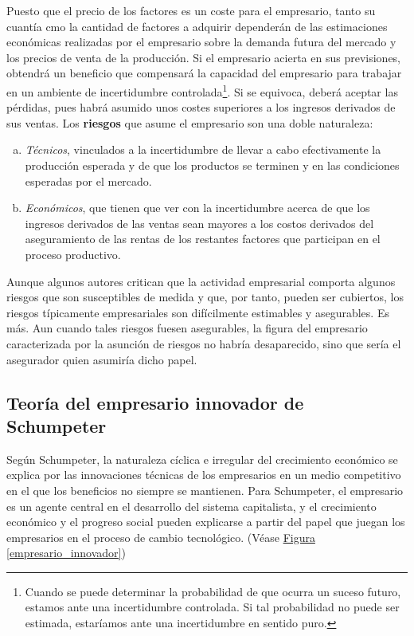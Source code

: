 \documentclass[12pt,a4paper,spanish]{report}
\begin{document}
			 Puesto que el precio de los factores es un coste para el empresario, tanto su cuantía cmo la cantidad de factores a adquirir dependerán de las estimaciones económicas realizadas por el empresario sobre la demanda futura del mercado y los precios de venta de la producción. Si el empresario acierta en sus previsiones, obtendrá un beneficio que compensará la capacidad del empresario para trabajar en un ambiente de incertidumbre controlada\footnote{Cuando se puede determinar la probabilidad de que ocurra un suceso futuro, estamos ante una incertidumbre controlada. Si tal probabilidad no puede ser estimada, estaríamos ante una incertidumbre en sentido puro.}. Si se equivoca, deberá aceptar las pérdidas, pues habrá asumido unos costes superiores a los ingresos derivados de sus ventas.
			 \newpage
			 Los \textbf{riesgos} que asume el empresario son una doble naturaleza:
			 \begin{enumerate}[a)]
			 	\item \textcolor[rgb]{0.9,0.3,0.3}{\emph{Técnicos}}, vinculados a la incertidumbre de llevar a cabo efectivamente la producción esperada y de que los productos se terminen y en las condiciones esperadas por el mercado.
			 	\item \textcolor[rgb]{0.9,0.3,0.3}{\emph{Económicos}}, que tienen que ver con la incertidumbre acerca de que los ingresos derivados de las ventas sean mayores a los costos derivados del aseguramiento de las rentas de los restantes factores que participan en el proceso productivo.
			 \end{enumerate}

			 Aunque algunos autores critican que la actividad empresarial comporta algunos riesgos que son susceptibles de medida y que, por tanto, pueden ser cubiertos, los riesgos típicamente empresariales son difícilmente estimables y asegurables. Es más. Aun cuando tales riesgos fuesen asegurables, la figura del empresario caracterizada por la asunción de riesgos no habría desaparecido, sino que sería el asegurador quien asumiría dicho papel.

		\subsection{\textcolor[rgb]{0.9,0.3,0.3}Teoría del empresario innovador de Schumpeter}
			Según Schumpeter, la naturaleza cíclica e irregular del crecimiento económico se explica por las innovaciones técnicas de los empresarios en un medio competitivo en el que los beneficios no siempre se mantienen. Para Schumpeter, el empresario es un agente central en el desarrollo del sistema capitalista, y el crecimiento económico y el progreso social pueden explicarse a partir del papel que juegan los empresarios en el proceso de cambio tecnológico. (Véase \hyperref[empresario_innovador]{Figura \ref*{empresario_innovador}})
\end{document}
